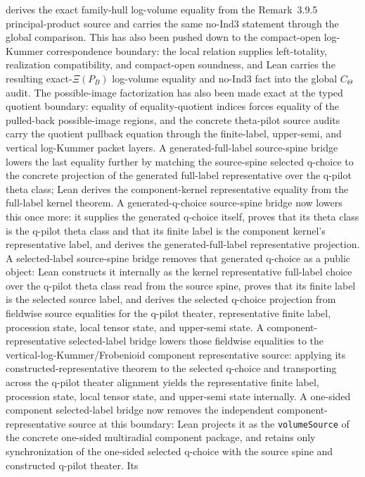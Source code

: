 \documentclass[11pt]{article}
\theoremstyle{plain}
\theoremstyle{definition}
\theoremstyle{remark}
\begin{document}
derives the exact family-hull log-volume equality from the Remark~3.9.5
principal-product source and carries the same no-Ind3 statement through the
global comparison.  This has also been pushed down to the compact-open
log-Kummer correspondence boundary: the local relation supplies left-totality,
realization compatibility, and compact-open soundness, and Lean carries the
resulting exact-\(\Xi(P_B)\) log-volume equality and no-Ind3 fact into the
global \(C_\Theta\) audit.  The
possible-image factorization has also been made exact at the typed quotient
boundary: equality of equality-quotient indices forces equality of the
pulled-back possible-image regions, and the concrete theta-pilot source audits
carry the quotient pullback equation through the finite-label, upper-semi, and
vertical log-Kummer packet layers.  A
generated-full-label source-spine bridge lowers the last equality further by
matching the source-spine selected q-choice to the concrete projection of the
generated full-label representative over the q-pilot theta class; Lean derives
the component-kernel representative equality from the full-label kernel theorem.
A generated-q-choice source-spine bridge now lowers this once more: it supplies
the generated q-choice itself, proves that its theta class is the q-pilot theta
class and that its finite label is the component kernel's representative label,
and derives the generated-full-label representative projection.  A
selected-label source-spine bridge removes that generated q-choice as a public
object: Lean constructs it internally as the kernel representative full-label
choice over the q-pilot theta class read from the source spine, proves that its
finite label is the selected source label, and derives the selected q-choice
projection from fieldwise source equalities for the q-pilot theater,
representative finite label, procession state, local tensor state, and
upper-semi state.  A component-representative selected-label bridge lowers
those fieldwise equalities to the vertical-log-Kummer/Frobenioid component
representative source: applying its constructed-representative theorem to the
selected q-choice and transporting across the q-pilot theater alignment yields
the representative finite label, procession state, local tensor state, and
upper-semi state internally.  A one-sided component selected-label bridge now
removes the independent component-representative source at this boundary: Lean
projects it as the \texttt{volumeSource} of the concrete one-sided multiradial
component package, and retains only synchronization of the one-sided selected
q-choice with the source spine and constructed q-pilot theater.  Its
\end{document}
